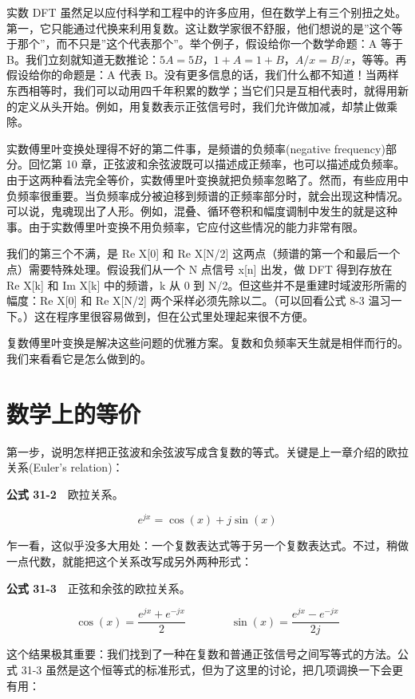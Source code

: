 实数 DFT
虽然足以应付科学和工程中的许多应用，但在数学上有三个别扭之处。第一，它只能通过代换来利用复数。这让数学家很不舒服，他们想说的是''这个等于那个''，而不只是''这个代表那个''。举个例子，假设给你一个数学命题：A
等于
B。我们立刻就知道无数推论：\(5A = 5B\)，\(1+A = 1+B\)，\(A/x = B/x\)，等等。再假设给你的命题是：A
代表
B。没有更多信息的话，我们什么都不知道！当两样东西相等时，我们可以动用四千年积累的数学；当它们只是互相代表时，就得用新的定义从头开始。例如，用复数表示正弦信号时，我们允许做加减，却禁止做乘除。

实数傅里叶变换处理得不好的第二件事，是频谱的负频率(negative
frequency)部分。回忆第 10
章，正弦波和余弦波既可以描述成正频率，也可以描述成负频率。由于这两种看法完全等价，实数傅里叶变换就把负频率忽略了。然而，有些应用中负频率很重要。当负频率成分被迫移到频谱的正频率部分时，就会出现这种情况。可以说，鬼魂现出了人形。例如，混叠、循环卷积和幅度调制中发生的就是这种事。由于实数傅里叶变换不用负频率，它应付这些情况的能力非常有限。

我们的第三个不满，是 Re X{[}0{]} 和 Re X{[}N/2{]}
这两点（频谱的第一个和最后一个点）需要特殊处理。假设我们从一个 N 点信号
x{[}n{]} 出发，做 DFT 得到存放在 Re X{[}k{]} 和 Im X{[}k{]} 中的频谱，k
从 0 到 N/2。但这些并不是重建时域波形所需的幅度：Re X{[}0{]} 和 Re
X{[}N/2{]} 两个采样必须先除以二。（可以回看公式 8-3
温习一下。）这在程序里很容易做到，但在公式里处理起来很不方便。

复数傅里叶变换是解决这些问题的优雅方案。复数和负频率天生就是相伴而行的。我们来看看它是怎么做到的。

\section{数学上的等价}

第一步，说明怎样把正弦波和余弦波写成含复数的等式。关键是上一章介绍的欧拉关系(Euler's
relation)：

\textbf{公式 31-2}　欧拉关系。

\[e^{jx} = \cos(x) + j\sin(x)\]

乍一看，这似乎没多大用处：一个复数表达式等于另一个复数表达式。不过，稍做一点代数，就能把这个关系改写成另外两种形式：

\textbf{公式 31-3}　正弦和余弦的欧拉关系。

\[\cos(x) = \frac{e^{jx} + e^{-jx}}{2} \qquad\qquad \sin(x) = \frac{e^{jx} - e^{-jx}}{2j}\]

这个结果极其重要：我们找到了一种在复数和普通正弦信号之间写等式的方法。公式
31-3
虽然是这个恒等式的标准形式，但为了这里的讨论，把几项调换一下会更有用：

